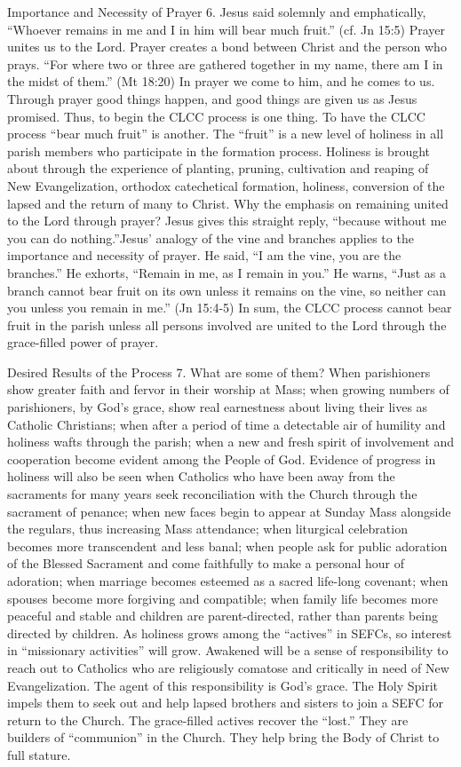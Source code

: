 \documentclass[oneside]{book}
\begin{document}
Importance and Necessity of Prayer
6. Jesus said solemnly and emphatically, ``Whoever remains in me and I in him
will bear much fruit.'' (cf. Jn 15:5) Prayer unites us to the Lord. Prayer
creates a bond between Christ and the person who prays. ``For where two or three
are gathered together in my name, there am I in the midst of them.'' (Mt 18:20)
In prayer we come to him, and he comes to us. Through prayer good things happen,
and good things are given us as Jesus promised. Thus, to begin the CLCC process
is one thing. To have the CLCC process ``bear much fruit'' is another. The
``fruit'' is a new level of holiness in all parish members who participate in
the formation process. Holiness is brought about through the experience of
planting, pruning, cultivation and reaping of New Evangelization, orthodox
catechetical formation, holiness, conversion of the lapsed and the return of
many to Christ.
Why the emphasis on remaining united to the Lord through prayer? Jesus gives
this straight reply, ``because without me you can do nothing.''Jesus' analogy of
the vine and branches applies to the importance and necessity of prayer. He
said, ``I am the vine, you are the branches.'' He exhorts, ``Remain in me, as I
remain in you.'' He warns, ``Just as a branch cannot bear fruit on its own
unless it remains on the vine, so neither can you unless you remain in me.'' (Jn
15:4-5) In sum, the CLCC process cannot bear fruit in the parish unless all
persons involved are united to the Lord through the grace-filled power of
prayer.

Desired Results of the Process
7. What are some of them? When parishioners show greater faith and fervor in
their worship at Mass; when growing numbers of parishioners, by God's grace,
show real earnestness about living their lives as Catholic Christians; when
after a period of time a detectable air of humility and holiness wafts through
the parish; when a new and fresh spirit of involvement and cooperation become
evident among the People of God.
Evidence of progress in holiness will also be seen when Catholics who have been
away from the sacraments for many years seek reconciliation with the Church
through the sacrament of penance; when new faces begin to appear at Sunday Mass
alongside the regulars, thus increasing Mass attendance; when liturgical
celebration becomes more transcendent and less banal; when people ask for public
adoration of the Blessed Sacrament and come faithfully to make a personal hour
of adoration; when marriage becomes esteemed as a sacred life-long covenant;
when spouses become more forgiving and compatible; when family life becomes more
peaceful and stable and children are parent-directed, rather than parents being
directed by children.
As holiness grows among the ``actives'' in SEFCs, so interest in ``missionary
activities'' will grow. Awakened will be a sense of responsibility to reach out
to Catholics who are religiously comatose and critically in need of New
Evangelization. The agent of this responsibility is God's grace. The Holy Spirit
impels them to seek out and help lapsed brothers and sisters to join a SEFC for
return to the Church. The grace-filled actives recover the ``lost.'' They are
builders of ``communion'' in the Church. They help bring the Body of Christ to
full stature.
\end{document}

